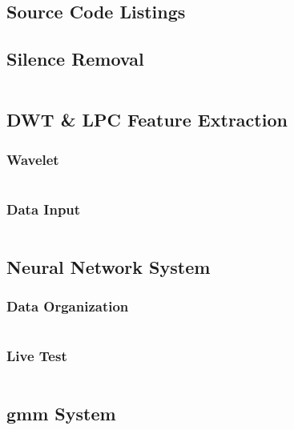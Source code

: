 \documentclass[12pt, a4paper, twoside]{report}
\begin{document}
\begin{appendices}
\chapter{Source Code Listings}

\section{Silence Removal}
\inputminted[linenos, numbersep=5pt, frame=single, breaklines=true, tabsize=2]
{Matlab}{codes/s-remove.m}

\section{DWT \& LPC Feature Extraction}
\subsection{Wavelet}
\inputminted[linenos, numbersep=5pt, frame=single, breaklines=true, tabsize=2]
{Matlab}{codes/dwt-wavelet.m}
\subsection{Data Input}
\inputminted[linenos, numbersep=5pt, frame=single, breaklines=true, tabsize=2]
{Matlab}{codes/dwt-lpc.m}

\section{Neural Network System}
\subsection{Data Organization}
\inputminted[linenos, numbersep=5pt, frame=single, breaklines=true, tabsize=2]
{Matlab}{codes/nn-get-data.m}
\subsection{Live Test}
\inputminted[linenos, numbersep=5pt, frame=single, breaklines=true, tabsize=2]
{Matlab}{codes/nn-live-cont.m}

\section{\acrshort{gmm} System}
\inputminted[linenos, numbersep=5pt, frame=single, breaklines=true, tabsize=2]
{Matlab}{codes/gmm.m}


\end{appendices}
\end{document}
